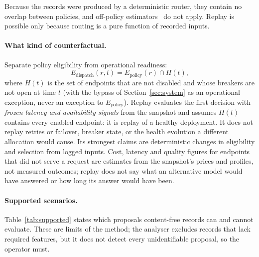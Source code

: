 \documentclass[11pt]{article}
\begin{document}
Because the records were produced by a deterministic router, they contain no overlap between
policies, and off-policy estimators~\cite{bottou,dudik} do not apply. Replay is possible only
because routing is a pure function of recorded inputs.

\paragraph{What kind of counterfactual.} Separate policy eligibility from operational readiness:
\[
  E_{\mathrm{dispatch}}(r,t) = E_{\mathrm{policy}}(r) \cap H(t),
\]
where $H(t)$ is the set of endpoints that are not disabled and whose breakers are not open at
time $t$ (with the bypass of Section~\ref{sec:system} as an operational exception, never an
exception to $E_{\mathrm{policy}}$). Replay evaluates the first decision with \emph{frozen
latency and availability signals} from the snapshot and assumes $H(t)$ contains every enabled
endpoint: it is replay of a healthy deployment. It does not replay retries or failover, breaker
state, or the health evolution a different allocation would cause. Its strongest claims are
deterministic changes in eligibility and selection from logged inputs. Cost, latency and
quality figures for endpoints that did not serve a request are estimates from the snapshot's
prices and profiles, not measured outcomes; replay does not say what an alternative model would
have answered or how long its answer would have been.

\paragraph{Supported scenarios.} Table~\ref{tab:supported} states which proposals content-free
records can and cannot evaluate. These are limits of the method; the analyser excludes records
that lack required features, but it does not detect every unidentifiable proposal, so the
operator must.
\end{document}
